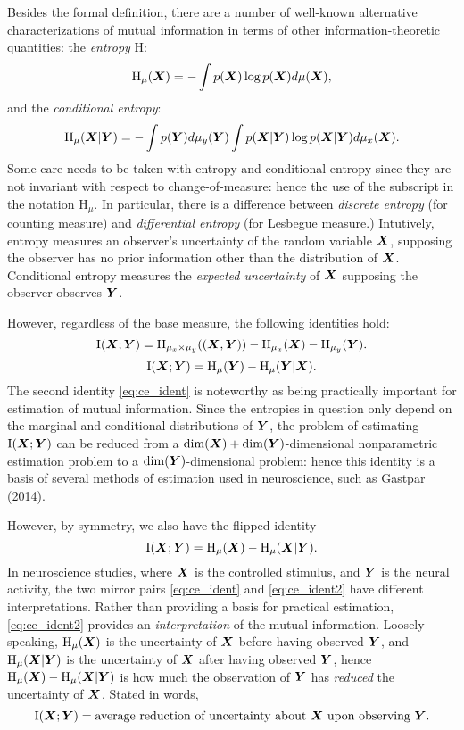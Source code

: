 \documentclass[12pt]{article}
\begin{document}
Besides the formal definition, there are a number of well-known alternative
characterizations of mutual information in terms of other
information-theoretic quantities: the \emph{entropy} $\text{H}$:
\[
\text{H}_\mu(\boldsymbol{X}) = -\int p(\boldsymbol{X}) \log p(\boldsymbol{X}) d\mu(\boldsymbol{X}),
\]
and the \emph{conditional entropy}:
\[
\text{H}_\mu(\boldsymbol{X}|\boldsymbol{Y}) = -\int p(\boldsymbol{Y}) d\mu_y(\boldsymbol{Y}) \int p(\boldsymbol{X}|\boldsymbol{Y}) \log p(\boldsymbol{X}|\boldsymbol{Y}) d\mu_x(\boldsymbol{X}).
\]
Some care needs to be taken with entropy and conditional entropy since
they are not invariant with respect to change-of-measure: hence the
use of the subscript in the notation $\text{H}_\mu$.  In particular,
there is a difference between \emph{discrete entropy} (for counting
measure) and \emph{differential entropy} (for Lesbegue measure.)
Intutively, entropy measures an observer's uncertainty of the random
variable $\boldsymbol{X}$, supposing the observer has no prior information other
than the distribution of $\boldsymbol{X}$. Conditional entropy measures
the \emph{expected uncertainty} of $\boldsymbol{X}$ supposing the observer
observes $\boldsymbol{Y}$.

However, regardless of the base measure, the following identities hold:
\[
\text{I}(\boldsymbol{X}; \boldsymbol{Y}) = \text{H}_{\mu_x \times \mu_y}((\boldsymbol{X}, \boldsymbol{Y})) - \text{H}_{\mu_x}(\boldsymbol{X}) - \text{H}_{\mu_y}(\boldsymbol{Y}).
\]
\begin{equation}\label{eq:ce_ident}
\text{I}(\boldsymbol{X}; \boldsymbol{Y}) = \text{H}_\mu(\boldsymbol{Y}) - \text{H}_\mu(\boldsymbol{Y}|\boldsymbol{X}).
\end{equation}
The second identity \eqref{eq:ce_ident} is noteworthy
as being practically important for estimation of mutual information.
Since the entropies in question only depend on the marginal and
conditional distributions of $\boldsymbol{Y}$, the problem of estimating
$\text{I}(\boldsymbol{X}; \boldsymbol{Y})$ can be reduced from a $\dim(\boldsymbol{X})
+ \dim(\boldsymbol{Y})$-dimensional nonparametric estimation problem to a
$\dim(\boldsymbol{Y})$-dimensional problem: hence this identity is a basis of
several methods of estimation used in neuroscience, such as Gastpar
(2014).

However, by symmetry, we also have the flipped identity
\begin{equation}\label{eq:ce_ident2}
\text{I}(\boldsymbol{X}; \boldsymbol{Y}) = \text{H}_\mu(\boldsymbol{X}) - \text{H}_\mu(\boldsymbol{X}|\boldsymbol{Y}).
\end{equation}
In neuroscience studies, where $\boldsymbol{X}$ is the controlled stimulus, and
$\boldsymbol{Y}$ is the neural activity, the two mirror pairs \eqref{eq:ce_ident}
and \eqref{eq:ce_ident2} have different interpretations.  Rather than
providing a basis for practical estimation, \eqref{eq:ce_ident2}
provides an \emph{interpretation} of the mutual information.  Loosely
speaking, $\text{H}_\mu(\boldsymbol{X})$ is the uncertainty of $\boldsymbol{X}$ before
having observed $\boldsymbol{Y}$, and $\text{H}_\mu(\boldsymbol{X}|\boldsymbol{Y})$ is the uncertainty
of $\boldsymbol{X}$ after having observed $\boldsymbol{Y}$, hence $\text{H}_\mu(\boldsymbol{X})
- \text{H}_\mu(\boldsymbol{X}|\boldsymbol{Y})$ is how much the observation of $\boldsymbol{Y}$
has \emph{reduced} the uncertainty of $\boldsymbol{X}$.  Stated in words,
\[
\text{I}(\boldsymbol{X}; \boldsymbol{Y}) = \text{average reduction of uncertainty about $\boldsymbol{X}$ upon observing $\boldsymbol{Y}$}.
\]
\end{document}
